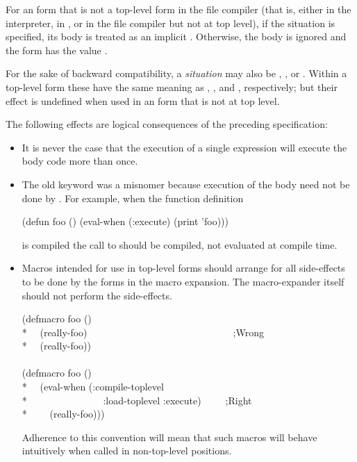 \begin{newer}
\begin{defspec}
  For an  form that is not a top-level form in the file compiler
  (that is, either in the interpreter, in , or in the file
  compiler but not at top level), if the  situation is specified,
  its body is treated as an implicit .  Otherwise, the body
  is ignored and the  form has the value .

  For the sake of backward compatibility,
  a \textit{situation} may also be , , or .
  Within a top-level  form
  these have the same meaning as , ,
  and , respectively; but their effect is undefined when used
  in an  form that is not at top level.

  The following effects are logical consequences of the preceding specification:
  \begin{itemize}
   \item It is never the case that the execution of a single 
     expression will execute the body code more than once.

   \item The old keyword  was a misnomer because execution of
     the body need not be done by .  For example, when the
     function definition
     \begin{lisp}
     (defun foo () (eval-when (:execute) (print 'foo)))
     \end{lisp}
     is compiled
     the call to  should be compiled, not evaluated at compile time.

   \item Macros intended for use in top-level forms should arrange for all
     side-effects to be done by the forms in the macro expansion.
     The macro-expander itself should not perform the side-effects.
\begin{lisp}
(defmacro foo () \\*
~~(really-foo)~~~~~~~~~~~~~~~~~~~~~~~~~~~~~~;{\rm Wrong}\\*
~~{\Xbq}(really-foo)) \\
\\
(defmacro foo () \\*
~~{\Xbq}(eval-when (:compile-toplevel \\*
~~~~~~~~~~~~~~~:load-toplevel :execute)~~~~~;{\rm Right} \\*
~~~~(really-foo)))
\end{lisp}
     Adherence to this convention will mean that such macros will behave
     intuitively when called in non-top-level positions.


\end{itemize}
\end{defspec}
\end{newer}
